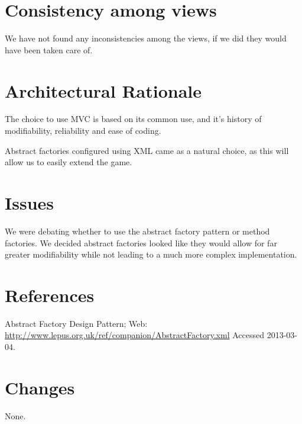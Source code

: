 \documentclass[12pt, a4paper]{article}
\begin{document}
\section{Consistency among views}
We have not found any inconsistencies among the views, if we did they would have been taken care of. 

\section{Architectural Rationale}
The choice to use MVC is based on its common use, and it’s history of modifiability, reliability and ease of coding.

Abstract factories configured using XML came as a natural choice, as this will allow us to easily extend the game. 

\section{Issues}
We were debating whether to use the abstract factory pattern or method factories. We decided abstract factories looked like they would allow for far greater modifiability while not leading to a much more complex implementation.

\section{References}
Abstract Factory Design Pattern; Web: \url{http://www.lepus.org.uk/ref/companion/AbstractFactory.xml} Accessed 2013-03-04.

\section{Changes}
None. 
\end{document}
